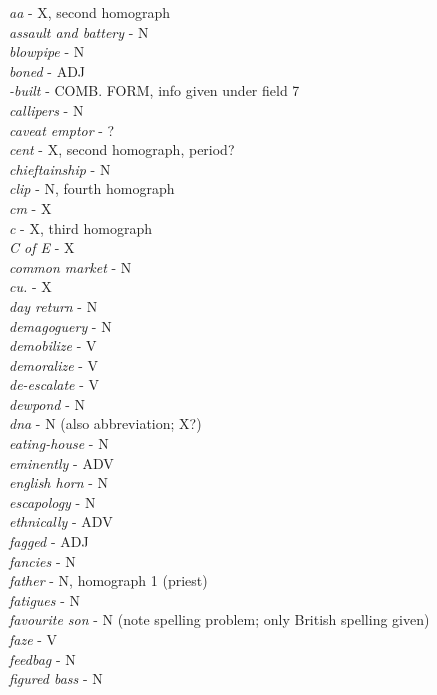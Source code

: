 \bigskip
\noindent
{\it aa}           -  X, second homograph   \\
{\it assault and battery} -  N  \\
{\it blowpipe}     -  N  \\
{\it boned}        -  ADJ  \\
{\it -built}       -  COMB. FORM, info given under field 7 \\
{\it callipers}    -  N  \\
{\it caveat emptor} - ? \\
{\it cent}         -  X, second homograph, period? \\
{\it chieftainship} - N \\
{\it clip}         -  N, fourth homograph \\
{\it cm}           -  X \\
{\it c}            -  X, third homograph \\
{\it C of E}       -  X \\
{\it common market} - N \\
{\it cu.}          -  X \\
{\it day return}   -  N \\			
{\it demagoguery}  -  N \\
{\it demobilize}   -  V \\
{\it demoralize}   -  V \\
{\it de-escalate}  -  V \\
{\it dewpond}      -  N \\
{\it dna}          -  N  (also abbreviation; X?) \\
{\it eating-house} -  N \\
{\it eminently}    -  ADV \\
{\it english horn} -  N \\
{\it escapology}   -  N \\
{\it ethnically}   -  ADV \\
{\it fagged}       -  ADJ \\
{\it fancies}      -  N \\
{\it father}       -  N, homograph 1 (priest) \\
{\it fatigues}     -  N \\
{\it favourite son} - N  (note spelling problem; only British spelling given) \\
{\it faze}         -  V \\
{\it feedbag}      -  N \\
{\it figured bass} -  N \\
